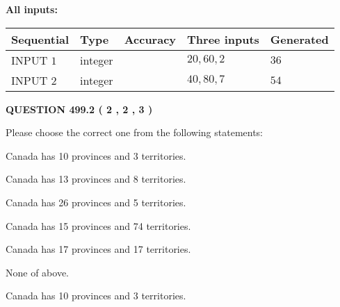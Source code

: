\documentclass[12pt]{article}
\begin{document}
   
   
   
\noindent{}
   
   
   
   
\noindent\vspace{0.1in}\hspace{-0.08in} {\textbf{\Large{All inputs: }}}
   
   
  
  
\noindent\begin{tabular}{|l|l|l|l|l|}
\hline
 Sequential & Type & Accuracy & Three inputs & Generated \\ 
\hline
 
 
  INPUT $  1 $ & integer &  & $
 20
 , 
 60
 , 
 2
 $ & $ 36 $ 
 \\  \hline  
 
 
  INPUT $  2 $ & integer &  & $
 40
 , 
 80
 , 
 7
 $ & $ 54 $ 
 \\  \hline  
 \end{tabular}
   
   
  
\vspace{0.2in}
  
{\textbf{\Large{QUESTION
499.2 
 ( 2 , 2 , 3 )
}}}
  
  
Please choose the correct one from the following statements:
 
 
Canada has 10  provinces and 3 territories.
 
 
Canada has  13 provinces and  8 territories.
 
 
Canada has  26 provinces and  5 territories.
 
 
Canada has  15 provinces and  74 territories.
 
 
Canada has  17 provinces and  17 territories.
 
 
 None of above.
 
 
\noindent{}
 
 
Canada has 10  provinces and 3 territories.
 
 
\noindent{}
 
 
   
\end{document}
